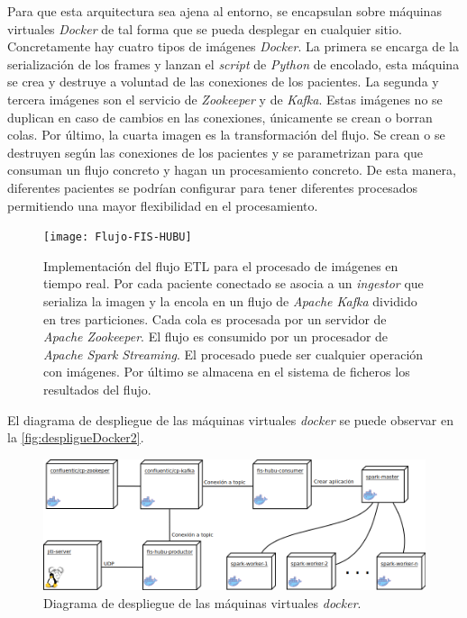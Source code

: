 Para que esta arquitectura sea ajena al entorno, se encapsulan sobre máquinas virtuales \textit{Docker} de tal forma que se pueda desplegar en cualquier sitio. Concretamente hay cuatro tipos de imágenes \textit{Docker}. La primera se encarga de la serialización de los frames y lanzan el \textit{script} de \textit{Python} de encolado, esta máquina se crea y destruye a voluntad de las conexiones de los pacientes. La segunda y tercera imágenes son el servicio de \textit{Zookeeper} y de \textit{Kafka}. Estas imágenes no se duplican en caso de cambios en las conexiones, únicamente se crean o borran colas. Por último, la cuarta imagen es la transformación del flujo. Se crean o se destruyen según las conexiones de los pacientes y se parametrizan para que consuman un flujo concreto y hagan un procesamiento concreto. De esta manera, diferentes pacientes se podrían configurar para tener diferentes procesados permitiendo una mayor flexibilidad en el procesamiento.

\begin{figure}[H]
	\centering
	\texttt{[image: Flujo-FIS-HUBU]}
	\caption[Implementación del flujo ETL para el procesado de imágenes en tiempo real.]{Implementación del flujo ETL para el procesado de imágenes en tiempo real. Por cada paciente conectado se asocia a un \textit{ingestor} que serializa la imagen y la encola en un flujo de \textit{Apache Kafka} dividido en tres particiones. Cada cola es procesada por un servidor de \textit{Apache Zookeeper}. El flujo es consumido por un procesador de \textit{Apache Spark Streaming}. El procesado puede ser cualquier operación con imágenes. Por último se almacena en el sistema de ficheros los resultados del flujo.}
	\label{fig:flujoetlreal}
\end{figure}

El diagrama de despliegue de las máquinas virtuales \textit{docker} se puede observar en la \autoref{fig:despligueDocker2}.

\begin{figure}
	\centering
	\includegraphics[width=1\textwidth]{img/DespliegueDocker.png}
	\caption{Diagrama de despliegue de las máquinas virtuales \textit{docker}.}
	\label{fig:despligueDocker2}
\end{figure}


